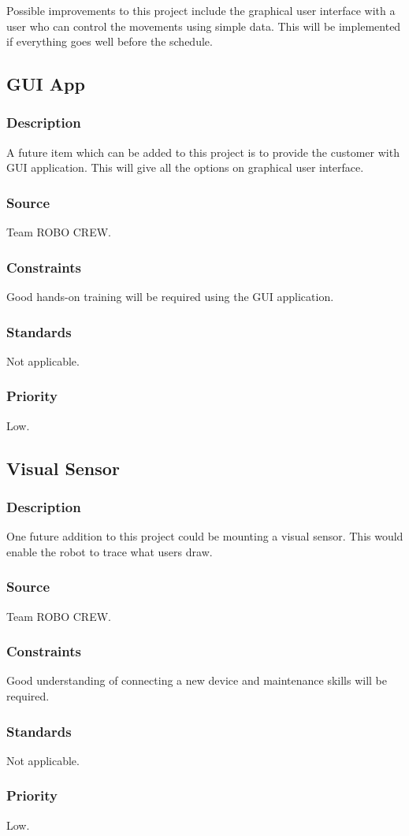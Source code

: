 Possible improvements to this project include the graphical user interface with a user who can control the movements using simple data. This will be implemented if everything goes well before the schedule.  
\subsection{GUI App}
\subsubsection{Description}
A future item which can be added to this project is to provide the customer with GUI application. This will give all the options on graphical user interface. 
\subsubsection{Source}
Team ROBO CREW.
\subsubsection{Constraints}
Good hands-on training will be required using the GUI application. 
\subsubsection{Standards}
Not applicable.  
\subsubsection{Priority}
Low.
\subsection{Visual Sensor}
\subsubsection{Description}
One future addition to this project could be mounting a visual sensor. This would enable the robot to trace what users draw.
\subsubsection{Source}
Team ROBO CREW.
\subsubsection{Constraints}
Good understanding of connecting a new device and maintenance skills will be required.
\subsubsection{Standards}
Not applicable.  
\subsubsection{Priority}
Low.